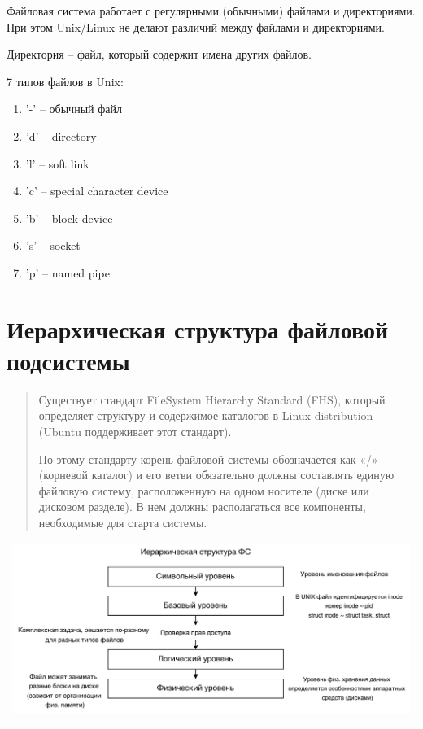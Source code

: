 Файловая система работает с регулярными (обычными) файлами и директориями. При этом Unix/Linux не делают различий между файлами и директориями.

Директория -- файл, который содержит имена других файлов.

7 типов файлов в Unix:
\begin{enumerate}
    \item '-' -- обычный файл
    \item 'd' -- directory
    \item 'l' -- soft link
    \item 'c' -- special character device
    \item 'b' -- block device
    \item 's' -- socket
    \item 'p' -- named pipe
\end{enumerate}

\section{Иерархическая структура файловой подсистемы}

\begin{quote}
Существует стандарт FileSystem Hierarchy Standard (FHS), который определяет структуру и содержимое каталогов в Linux distribution (Ubuntu поддерживает этот стандарт).

По этому стандарту корень файловой системы обозначается как «/» (корневой каталог) и его ветви обязательно должны составлять единую файловую систему, расположенную на одном носителе (диске или дисковом разделе). В нем должны располагаться все компоненты, необходимые для старта системы.
\end{quote}

\begin{table}[h!]
  \centering
  \begin{tabular}{p{1\linewidth}}
    \centering
    \includegraphics[width=0.8\linewidth]{./images/ierarh_fs.pdf}
  \end{tabular}
\end{table}

